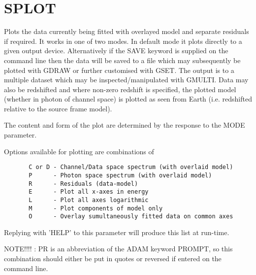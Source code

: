 \documentclass{book}
\renewcommand{\_}{{\tt\char'137}}     %
\begin{document}
\section{SPLOT}
Plots the data currently being fitted with overlayed model and
separate residuals if required. It works in one of two modes.
In default mode it plots directly to a given output device.
Alternatively if the SAVE keyword is supplied on the command line
then the data will be saved to a file which may subsequently be
plotted with GDRAW or further customised with GSET. The output
is to a multiple dataset which may be inspected/manipulated with
GMULTI. Data may also be redshifted and where non-zero redshift
is specified, the plotted model (whether in photon of channel
space) is plotted as seen from Earth (i.e. redshifted relative to
the source frame model).
 
The content and form of the plot are determined by the response
to the MODE parameter.
 
Options available for plotting are combinations of
 
\begin{verbatim}
       C or D - Channel/Data space spectrum (with overlaid model)
       P      - Photon space spectrum (with overlaid model)
       R      - Residuals (data-model)
       E      - Plot all x-axes in energy
       L      - Plot all axes logarithmic
       M      - Plot components of model only
       O      - Overlay sumultaneously fitted data on common axes
\end{verbatim}
Replying with 'HELP' to this parameter will produce this list at
run-time.
 
NOTE!!!! : PR is an abbreviation of the ADAM keyword PROMPT, so this
combination should either be put in quotes or reversed if
entered on the command line.
\end{document}
